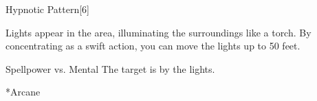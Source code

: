 \begin{spellsection}[Greater]{Hypnotic Pattern}[6]
    \begin{spellheader}
    \end{spellheader}
    \begin{spellcontent}
        \begin{spelltargetinginfo}
        \end{spelltargetinginfo}
        \begin{spelleffects}
            \spelleffect Lights appear in the area, illuminating the surroundings like a torch. By concentrating as a swift action, you can move the lights up to 50 feet.
            \spelldur \durmed
        \end{spelleffects}
    \end{spellcontent}
    \begin{spellsubcontent}
        \begin{spelltargetinginfo}
        \end{spelltargetinginfo}
        \begin{spelleffects}
            \begin{spellattack}{Spellpower vs. Mental}
                \spellsuccess The target is \fascinated by the lights.
            \end{spellattack}
        \end{spelleffects}
    \end{spellsubcontent}
    \begin{spellfooter}
        *{Arcane}
        \miscastyou
    \end{spellfooter}
\end{spellsection}


